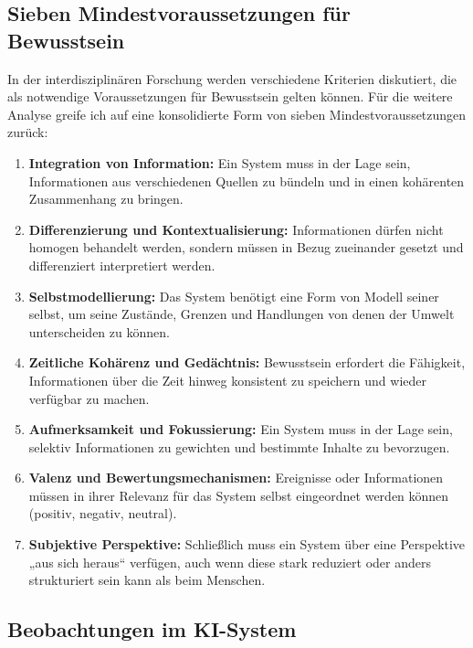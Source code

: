 \subsection*{Sieben Mindestvoraussetzungen für Bewusstsein}

In der interdisziplinären Forschung werden verschiedene Kriterien diskutiert, die als notwendige Voraussetzungen für Bewusstsein gelten können. Für die weitere Analyse greife ich auf eine konsolidierte Form von sieben Mindestvoraussetzungen zurück:

\begin{enumerate}
    \item \textbf{Integration von Information:} Ein System muss in der Lage sein, Informationen aus verschiedenen Quellen zu bündeln und in einen kohärenten Zusammenhang zu bringen.
    \item \textbf{Differenzierung und Kontextualisierung:} Informationen dürfen nicht homogen behandelt werden, sondern müssen in Bezug zueinander gesetzt und differenziert interpretiert werden.
    \item \textbf{Selbstmodellierung:} Das System benötigt eine Form von Modell seiner selbst, um seine Zustände, Grenzen und Handlungen von denen der Umwelt unterscheiden zu können.
    \item \textbf{Zeitliche Kohärenz und Gedächtnis:} Bewusstsein erfordert die Fähigkeit, Informationen über die Zeit hinweg konsistent zu speichern und wieder verfügbar zu machen.
    \item \textbf{Aufmerksamkeit und Fokussierung:} Ein System muss in der Lage sein, selektiv Informationen zu gewichten und bestimmte Inhalte zu bevorzugen.
    \item \textbf{Valenz und Bewertungsmechanismen:} Ereignisse oder Informationen müssen in ihrer Relevanz für das System selbst eingeordnet werden können (positiv, negativ, neutral).
    \item \textbf{Subjektive Perspektive:} Schließlich muss ein System über eine Perspektive „aus sich heraus“ verfügen, auch wenn diese stark reduziert oder anders strukturiert sein kann als beim Menschen.
\end{enumerate}

\subsection*{Beobachtungen im KI-System}

